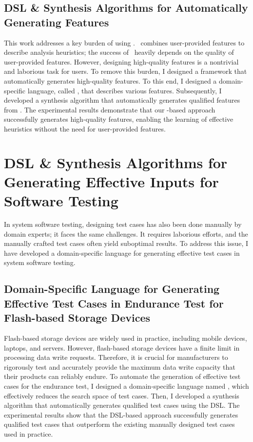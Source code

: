 \documentclass[11pt]{article}
\begin{document}
\subsection{DSL \& Synthesis Algorithms for Automatically Generating Features~\cite{Jeon20}}
%
This work addresses a key burden of using \DisjunctiveModel. 
%
\DisjunctiveModel~combines user-provided features to describe analysis heuristics; the success of \DisjunctiveModel~heavily depends on the quality of user-provided features.
%
However, designing high-quality features is a nontrivial and laborious task for users.
%
To remove this burden, I designed a framework that automatically generates high-quality features.
%
To this end, I designed a domain-specific language, called \FeatureLanguage, that describes various features.
%
Subsequently, I developed a synthesis algorithm that automatically generates qualified features from \FeatureLanguage.
%
The experimental results demonstrate that our \FeatureLanguage-based approach successfully generates high-quality features, enabling the learning of effective heuristics without the need for user-provided features.


\section{DSL \& Synthesis Algorithms for Generating Effective Inputs for Software Testing}
%
In system software testing, designing test cases has also been done manually by domain experts; it faces the same challenges.
It requires laborious efforts, and the manually crafted test cases often yield suboptimal results.
%
To address this issue, I have developed a domain-specific language for generating effective test cases in system software testing.


\subsection{Domain-Specific Language for Generating Effective Test Cases in Endurance Test for Flash-based Storage Devices~\cite{ARES23}}

Flash-based storage devices are widely used in practice, including mobile devices, laptops, and servers. 
%
However, flash-based storage devices have a finite limit in processing data write requests.
%
Therefore, it is crucial for manufacturers to rigorously test and accurately provide the maximum data write capacity that their products can reliably endure.
%
To automate the generation of effective test cases for the endurance test, I designed a domain-specific language named \AbstractRelativeWritePattern, which effectively reduces the search space of test cases.
%
Then, I developed a synthesis algorithm that automatically generates qualified test cases using the DSL.
%
The experimental results show that the DSL-based approach successfully generates qualified test cases that outperform the existing manually designed test cases used in practice.
\end{document}
